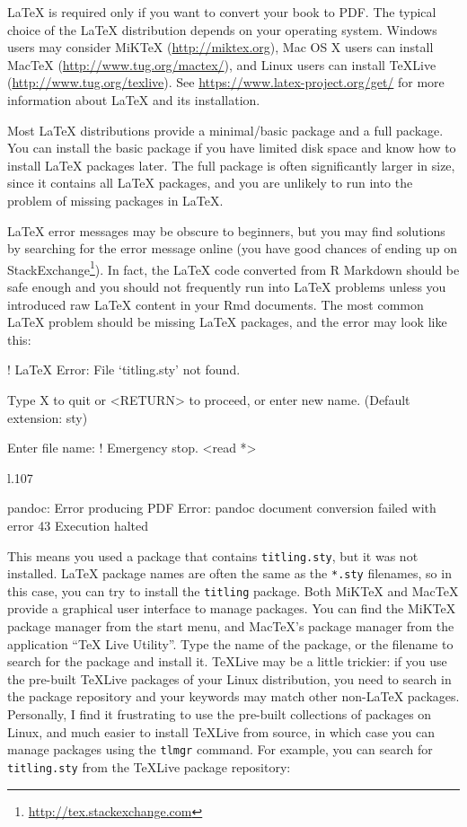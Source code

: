 \documentclass[
  12pt,
]{krantz}
\makeatletter
\newenvironment{Shaded}{\begin{snugshade}}{\end{snugshade}}
\newcommand{\NormalTok}[1]{#1}
\renewcommand{\href}[2]{#2\footnote{\url{#1}}}
\newenvironment{kframe}{%
\medskip{}
\setlength{\fboxsep}{.8em}
 \def\at@end@of@kframe{}%
 \ifinner\ifhmode%
  \def\at@end@of@kframe{\end{minipage}}%
  \begin{minipage}{\columnwidth}%
 \fi\fi%
 \def\FrameCommand##1{\hskip\@totalleftmargin \hskip-\fboxsep
 \colorbox{shadecolor}{##1}\hskip-\fboxsep
     \hskip-\linewidth \hskip-\@totalleftmargin \hskip\columnwidth}%
 \MakeFramed {\advance\hsize-\width
   \@totalleftmargin\z@ \linewidth\hsize
   \@setminipage}}%
 {\par\unskip\endMakeFramed%
 \at@end@of@kframe}
\renewenvironment{Shaded}{\begin{kframe}}{\end{kframe}}
\makeatother
\begin{document}
LaTeX is required only if you want to convert your book to PDF. The typical choice of the LaTeX distribution depends on your operating system. Windows users may consider MiKTeX (\url{http://miktex.org}), Mac OS X users can install MacTeX (\url{http://www.tug.org/mactex/}), and Linux users can install TeXLive (\url{http://www.tug.org/texlive}). See \url{https://www.latex-project.org/get/} for more information about LaTeX and its installation.

Most LaTeX distributions provide a minimal/basic package and a full package. You can install the basic package if you have limited disk space and know how to install LaTeX packages later. The full package is often significantly larger in size, since it contains all LaTeX packages, and you are unlikely to run into the problem of missing packages in LaTeX.

LaTeX error messages may be obscure to beginners, but you may find solutions by searching for the error message online (you have good chances of ending up on \href{http://tex.stackexchange.com}{StackExchange}). In fact, the LaTeX code converted from R Markdown should be safe enough and you should not frequently run into LaTeX problems unless you introduced raw LaTeX content in your Rmd documents. The most common LaTeX problem should be missing LaTeX packages, and the error may look like this:

\begin{Shaded}
\begin{Highlighting}[]
\NormalTok{! LaTeX Error: File `titling.sty' not found.}

\NormalTok{Type X to quit or <RETURN> to proceed,}
\NormalTok{or enter new name. (Default extension: sty)}

\NormalTok{Enter file name: }
\NormalTok{! Emergency stop.}
\NormalTok{<read *> }
         
\NormalTok{l.107 ^^M}

\NormalTok{pandoc: Error producing PDF}
\NormalTok{Error: pandoc document conversion failed with error 43}
\NormalTok{Execution halted}
\end{Highlighting}
\end{Shaded}

This means you used a package that contains \texttt{titling.sty}, but it was not installed. LaTeX package names are often the same as the \texttt{*.sty} filenames, so in this case, you can try to install the \texttt{titling} package. Both MiKTeX and MacTeX provide a graphical user interface to manage packages. You can find the MiKTeX package manager from the start menu, and MacTeX's package manager from the application ``TeX Live Utility''. Type the name of the package, or the filename to search for the package and install it. TeXLive may be a little trickier: if you use the pre-built TeXLive packages of your Linux distribution, you need to search in the package repository and your keywords may match other non-LaTeX packages. Personally, I find it frustrating to use the pre-built collections of packages on Linux, and much easier to install TeXLive from source, in which case you can manage packages using the \texttt{tlmgr} command. For example, you can search for \texttt{titling.sty} from the TeXLive package repository:
\end{document}
